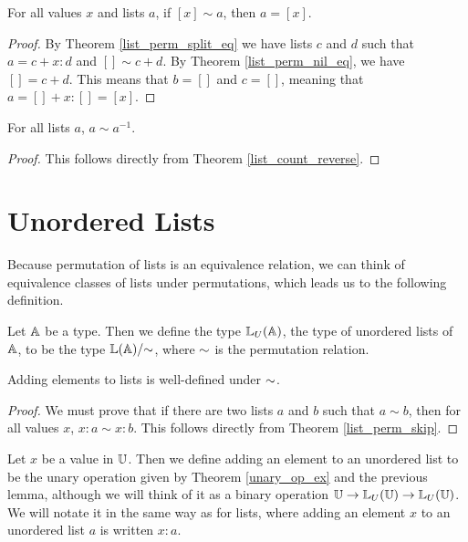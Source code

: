 \documentclass[../../math.tex]{subfiles}
\begin{document}
\begin{theorem} \label{list_perm_single}
    For all values $x$ and lists $a$, if $[x] \sim a$, then $a = [x]$.
\end{theorem}
\begin{proof}
    By Theorem \ref{list_perm_split_eq} we have lists $c$ and $d$ such that $a =
    c + x : d$ and $[] \sim c + d$.  By Theorem \ref{list_perm_nil_eq}, we have
    $[] = c + d$.  This means that $b = []$ and $c = []$,  meaning that $a = []
    + x : [] = [x]$.
\end{proof}

\begin{theorem} \label{list_perm_reverse}
    For all lists $a$, $a \sim a^{-1}$.
\end{theorem}
\begin{proof}
    This follows directly from Theorem \ref{list_count_reverse}.
\end{proof}

\section{Unordered Lists}

Because permutation of lists is an equivalence relation, we can think of
equivalence classes of lists under permutations, which leads us to the following
definition.

\begin{definition}
    Let $\mathbb{A}$ be a type.  Then we define the type $\mathbb{L}_U(\mathbb{A})$, the type of
    unordered lists of $\mathbb{A}$, to be the type  $\mathbb{L}(\mathbb{A})/{\sim}$, where ${\sim}$ is
    the permutation relation.
\end{definition}

\begin{lemma}
    Adding elements to lists is well-defined under ${\sim}$.
\end{lemma}
\begin{proof}
    We must prove that if there are two lists $a$ and $b$ such that $a \sim b$,
    then for all values $x$, $x : a \sim x : b$.  This follows directly from
    Theorem \ref{list_perm_skip}.
\end{proof}

\begin{definition}
    Let $x$ be a value in $\mathbb{U}$.  Then we define adding an element to an
    unordered list to be the unary operation given by Theorem \ref{unary_op_ex}
    and the previous lemma, although we will think of it as a binary operation
    $\mathbb{U} \to \mathbb{L}_U(\mathbb{U}) \to \mathbb{L}_U(\mathbb{U})$.  We will notate it in the same way as for
    lists, where adding an element $x$ to an unordered list $a$ is written $x :
    a$.
\end{definition}
\end{document}

